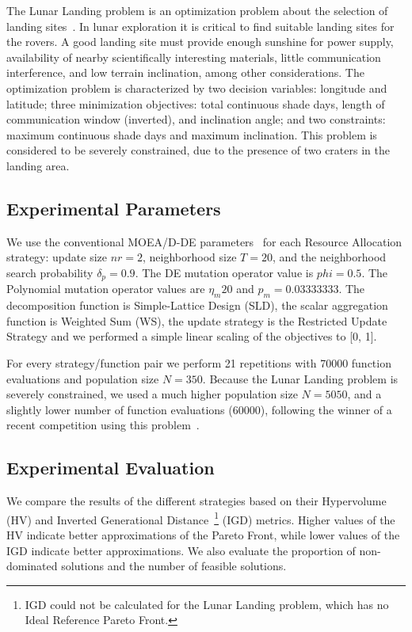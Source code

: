 The Lunar Landing problem is an optimization problem about the selection of landing sites~\citep{MoonOrbitingSatellite2015}. In lunar exploration it is critical to find suitable landing sites for the rovers. A good landing site must provide enough sunshine for power supply, availability of nearby scientifically interesting materials, little communication interference, and low terrain inclination, among other considerations. The optimization problem is characterized by two decision variables: longitude and latitude; three minimization objectives: total continuous shade days, length of communication window (inverted), and inclination angle; and two constraints: maximum continuous shade days and maximum inclination. This problem is considered to be severely constrained, due to the presence of two craters in the landing area.

\subsection{Experimental Parameters}

We use the conventional MOEA/D-DE parameters~\cite{li2009multiobjective} for each Resource Allocation strategy: update size $nr = 2$, neighborhood size $T = 20$, and the neighborhood search probability $\delta_p = 0.9$. The DE mutation operator value is $phi=0.5$. The Polynomial mutation operator values are $\eta_m 20$ and $p_m = 0.03333333$. The decomposition function is Simple-Lattice Design (SLD), the scalar aggregation function is Weighted Sum (WS), the update strategy is the Restricted Update Strategy and we performed a simple linear scaling of the objectives to [0, 1].

For every strategy/function pair we perform 21 repetitions with 70000 function evaluations and population size $N=350$. Because the Lunar Landing problem is severely constrained, we used a much higher population size $N=5050$, and a slightly lower number of function evaluations (60000), following the winner of a recent competition using this problem~\cite{Competition2018}.

\subsection{Experimental Evaluation}

We compare the results of the different strategies based on their Hypervolume (HV) and Inverted Generational Distance~\footnote{IGD could not be calculated for the Lunar Landing problem, which has no Ideal Reference Pareto Front.} (IGD) metrics. Higher values of the HV indicate better approximations of the Pareto Front, while lower values of the IGD indicate better approximations. We also evaluate the proportion of non-dominated solutions and the number of feasible solutions.

